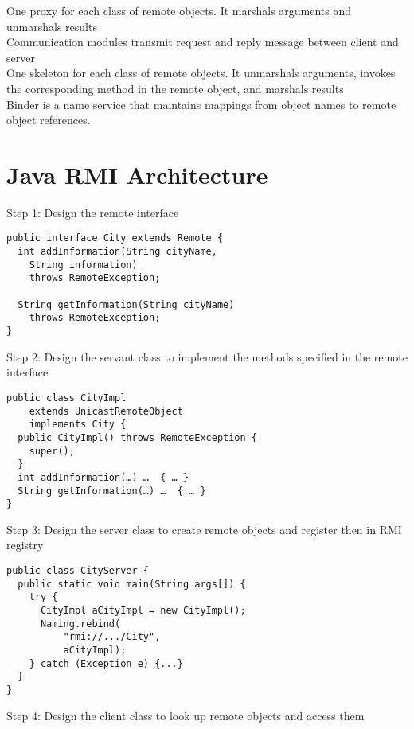 \begin{multicols*}{2}
\noindent One proxy for each class of remote objects. It marshals arguments and unmarshals results\\

\noindent Communication modules transmit request and reply message between client and server\\

\noindent One skeleton for each class of remote objects. It unmarshals arguments, invokes the corresponding method in the remote object, and marshals results\\

\noindent Binder is a name service that maintains mappings from object names to remote object references.

\section{Java RMI Architecture}

\noindent Step 1: Design the remote interface

\begin{verbatim}
public interface City extends Remote {
  int addInformation(String cityName, 
    String information)
    throws RemoteException;

  String getInformation(String cityName)
    throws RemoteException;
}
\end{verbatim}

\noindent Step 2: Design the servant class to implement the methods specified in the remote interface

\begin{verbatim}
public class CityImpl
    extends UnicastRemoteObject
    implements City {
  public CityImpl() throws RemoteException {
    super();
  }
  int addInformation(…) …  { … }
  String getInformation(…) …  { … }
}
\end{verbatim}

\noindent Step 3: Design the server class to create remote objects and register then in RMI registry

\begin{verbatim}
public class CityServer {
  public static void main(String args[]) {
    try {
      CityImpl aCityImpl = new CityImpl();
      Naming.rebind(
          "rmi://.../City", 
          aCityImpl);
    } catch (Exception e) {...}
  }
}
\end{verbatim}

\noindent Step 4: Design the client  class to look up remote objects and access them


\end{multicols*}
